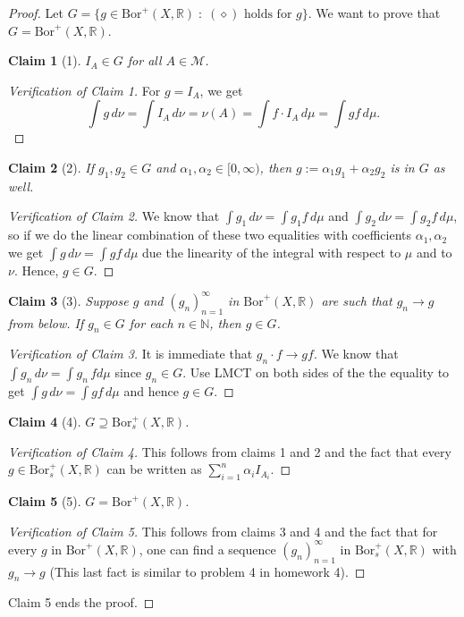 \documentclass[letterpaper, 12pt]{article}
\newcommand{\st}{\; : \; }
\newcommand{\cM}{\mathcal{M}}
\newcommand{\bR}{\mathbb{R}}
\newcommand{\bN}{\mathbb{N}}
\newcommand{\Bor}{\mathrm{Bor}}
\theoremstyle{stdthm}
\theoremstyle{stddef}
\theoremstyle{stdnonum}
\newtheorem{claim}{Claim}
\theoremstyle{stdqands}
\theoremstyle{stdbold}
\begin{document}
\begin{proof}
Let $G = \{ g \in \Bor^+(X,\bR) \st (\diamond) \mbox{ holds for } g \}$. We want to prove that $G = \Bor^+(X,\bR)$.

\begin{claim}[1]
$I_A \in G$ for all $A \in \cM$.
\end{claim}  

\begin{proof} [Verification of Claim 1]
For $g = I_A$, we get 
\[ \int g \, d\nu = \int I_A \, d\nu = \nu(A) = \int f \cdot I_A \, d\mu = \int gf \, d\mu. \]
\end{proof}

\begin{claim}[2]
If $g_1,g_2 \in G$ and $\alpha_1,\alpha_2 \in [0,\infty)$, then $g:= \alpha_1 g_1 + \alpha_2 g_2 $ is in $G$ as well. 
\end{claim}

\begin{proof} [Verification of Claim 2]
We know that $\int g_1 \,d \nu = \int g_1 f \, d\mu$ and $\int g_2 \, d\nu = \int g_2 f \,d\mu$, so if we do the linear combination of these two equalities with coefficients $\alpha_1,\alpha_2$ we get $\int g \, d \nu = \int gf \, d\mu$ due the linearity of the integral with respect to $\mu$ and to $\nu$. Hence, $g \in G$.
\end{proof}

\begin{claim}[3]
Suppose $g$ and $(g_n)_{n=1}^\infty$ in $\Bor^+(X,\bR)$ are such that $g_n \rightarrow g$ from below. If $g_n \in G$ for each $n \in \bN$, then $g \in G$. 
\end{claim}

\begin{proof} [Verification of Claim 3]
It is immediate that $g_n \cdot f \rightarrow gf$. We know that $\int g_n \, d\nu = \int g_n \, f d\mu$ since $g_n \in G$.  Use LMCT on both sides of the the equality to get $\int g\, d \nu = \int gf \, d\mu$ and hence $g \in G$. 
\end{proof}

\begin{claim}[4]
$G \supseteq \Bor_s^+ (X,\bR)$.
\end{claim}
\begin{proof}[Verification of Claim 4]
This follows from claims 1 and 2 and the fact that every $g \in \Bor_s^+(X,\bR)$ can be written as $\sum_{i=1}^n \alpha_i I_{A_i}$.  
\end{proof}

\begin{claim}[5]
$G = \Bor^+(X,\bR)$. 
\end{claim}
\begin{proof}[Verification of Claim 5]
This follows from claims 3 and 4 and the fact that for every $g$ in $\Bor^+(X,\bR)$, one can find a sequence $(g_n)_{n=1}^\infty$ in $\Bor_s^+(X,\bR)$ with $g_n \rightarrow g$ (This last fact is similar to problem 4 in homework 4). 
\end{proof}
\noindent Claim 5 ends the proof.
\end{proof}
\end{document}

